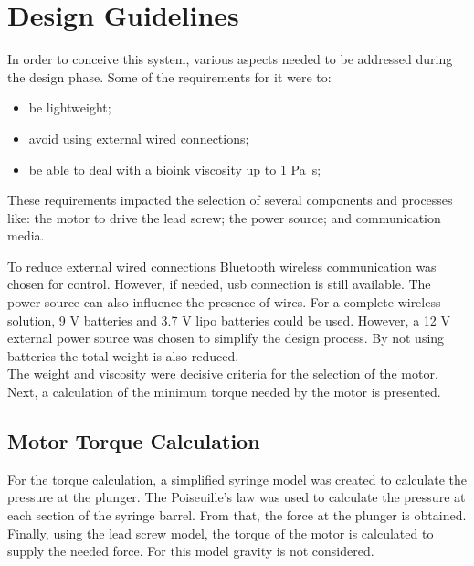 

\section{Design Guidelines}
\label{sec:bioprinting_system_design_guidelines}

In order to conceive this system, various aspects needed to be addressed during the design phase. Some of the requirements for it were to:

\begin{itemize}
    \item be lightweight;
    \item avoid using external wired connections;
    \item be able to deal with a bioink viscosity up to 1 \si{\pascal\second};
\end{itemize}

These requirements impacted the selection of several components and processes like: the motor to drive the lead screw; the power source; and communication media.

To reduce external wired connections Bluetooth wireless communication was chosen for control. However, if needed, \gls{usb} connection is still available. The power source can also influence the presence of wires. For a complete wireless solution, 9 \si{\volt} batteries and 3.7 \si{\volt} \gls{lipo} batteries could be used. However, a 12 \si{\volt} external power source was chosen to simplify the design process. By not using batteries the total weight is also reduced.\\

The weight and viscosity were decisive criteria for the selection of the motor. Next, a calculation of the minimum torque needed by the motor is presented.

\subsection{Motor Torque Calculation}
\label{subsec:bioprinting_system_design_guidelines_torque_calculation}

For the torque calculation, a simplified syringe model was created to calculate the pressure at the plunger. The Poiseuille's law was used to calculate the pressure at each section of the syringe barrel. From that, the force at the plunger is obtained. Finally, using the lead screw model, the torque of the motor is calculated to supply the needed force. For this model gravity is not considered.\\

